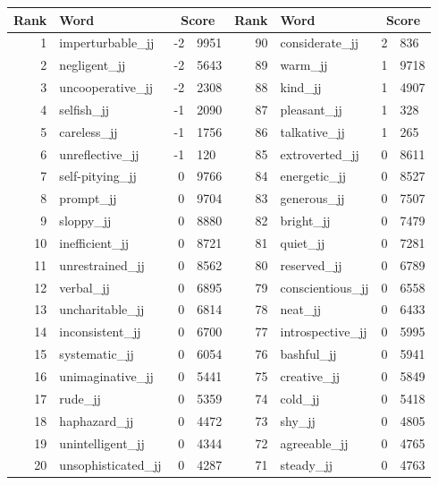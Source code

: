 \begin{table}[tbp]
    \begin{tabular}{| rlr@{.}l | rlr@{.}l |}
    \hline
    \textbf{Rank} & \textbf{Word} & \multicolumn{2}{c|}{\textbf{Score}} & \textbf{Rank} & \textbf{Word} & \multicolumn{2}{c|}{\textbf{Score}} \\
    \hline
    1 & imperturbable\_jj & -2 & 9951    &    90 & considerate\_jj & 2 & 836 \\
    2 & negligent\_jj & -2 & 5643    &    89 & warm\_jj & 1 & 9718 \\
    3 & uncooperative\_jj & -2 & 2308    &    88 & kind\_jj & 1 & 4907 \\
    4 & selfish\_jj & -1 & 2090    &    87 & pleasant\_jj & 1 & 328 \\
    5 & careless\_jj & -1 & 1756    &    86 & talkative\_jj & 1 & 265 \\
    6 & unreflective\_jj & -1 & 120    &    85 & extroverted\_jj & 0 & 8611 \\
    7 & self-pitying\_jj & 0 & 9766    &    84 & energetic\_jj & 0 & 8527 \\
    8 & prompt\_jj & 0 & 9704    &    83 & generous\_jj & 0 & 7507 \\
    9 & sloppy\_jj & 0 & 8880    &    82 & bright\_jj & 0 & 7479 \\
    10 & inefficient\_jj & 0 & 8721    &    81 & quiet\_jj & 0 & 7281 \\
    11 & unrestrained\_jj & 0 & 8562    &    80 & reserved\_jj & 0 & 6789 \\
    12 & verbal\_jj & 0 & 6895    &    79 & conscientious\_jj & 0 & 6558 \\
    13 & uncharitable\_jj & 0 & 6814    &    78 & neat\_jj & 0 & 6433 \\
    14 & inconsistent\_jj & 0 & 6700    &    77 & introspective\_jj & 0 & 5995 \\
    15 & systematic\_jj & 0 & 6054    &    76 & bashful\_jj & 0 & 5941 \\
    16 & unimaginative\_jj & 0 & 5441    &    75 & creative\_jj & 0 & 5849 \\
    17 & rude\_jj & 0 & 5359    &    74 & cold\_jj & 0 & 5418 \\
    18 & haphazard\_jj & 0 & 4472    &    73 & shy\_jj & 0 & 4805 \\
    19 & unintelligent\_jj & 0 & 4344    &    72 & agreeable\_jj & 0 & 4765 \\
    20 & unsophisticated\_jj & 0 & 4287    &    71 & steady\_jj & 0 & 4763 \\

\end{tabular}
\end{table}
